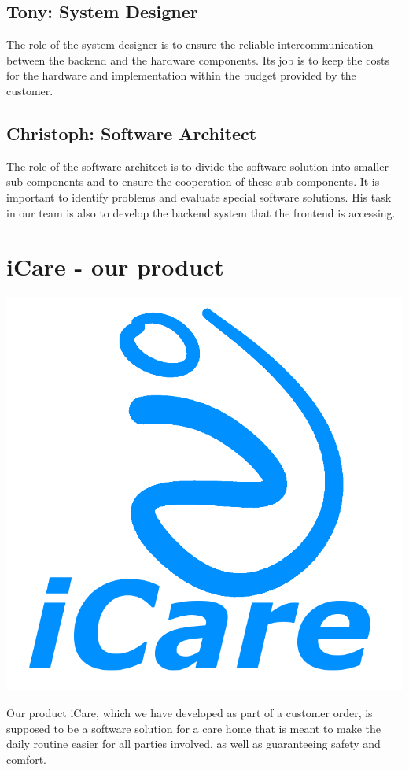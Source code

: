 \subsection{Tony: System Designer}
\label{sec:orgd672b29}
The role of the system designer is to ensure the reliable intercommunication between the backend and the hardware components.
Its job is to keep the costs for the hardware and implementation within the budget provided by the customer.
\subsection{Christoph: Software Architect}
\label{sec:orgd60e06e}
The role of the software architect is to divide the software solution into
smaller sub-components and to ensure the cooperation of these sub-components. It
is important to identify problems and evaluate special software solutions. His
task in our team is also to develop the backend system that the frontend is
accessing.

\section{iCare - our product}
\label{sec:org698e8a5}
\begin{center}
\includegraphics[width=.9\linewidth]{./content/iCare.jpeg}
\end{center}
Our product iCare, which we have developed as part of a customer order, is
supposed to be a software solution for a care home that is meant to make the
daily routine easier for all parties involved, as well as guaranteeing safety
and comfort.

